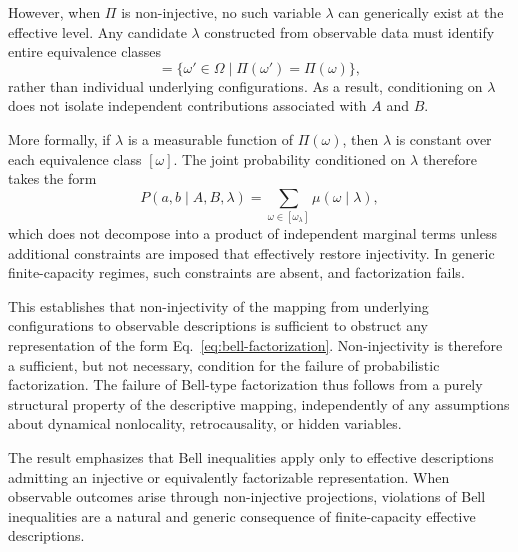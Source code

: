   However, when $\Pi$ is non-injective, no such variable $\lambda$ can generically
  exist at the effective level.
  Any candidate $\lambda$ constructed from observable data must identify entire
  equivalence classes
  \begin{equation}
    [\omega] = \{\omega' \in \Omega \mid \Pi(\omega')=\Pi(\omega)\},
  \end{equation}
  rather than individual underlying configurations.
  As a result, conditioning on $\lambda$ does not isolate independent contributions
  associated with $A$ and $B$.

  More formally, if $\lambda$ is a measurable function of $\Pi(\omega)$, then $\lambda$
  is constant over each equivalence class $[\omega]$.
  The joint probability conditioned on $\lambda$ therefore takes the form
  \begin{equation}
    P(a,b \mid A,B,\lambda)
    =
    \sum_{\omega \in [\omega_\lambda]} \mu(\omega \mid \lambda),
  \end{equation}
  which does not decompose into a product of independent marginal terms unless
  additional constraints are imposed that effectively restore injectivity.
  In generic finite-capacity regimes, such constraints are absent, and factorization fails.

  This establishes that non-injectivity of the mapping from underlying configurations
  to observable descriptions is sufficient to obstruct any representation of the form
  Eq.~\eqref{eq:bell-factorization}.
  Non-injectivity is therefore a sufficient, but not necessary, condition for the
  failure of probabilistic factorization.
  The failure of Bell-type factorization thus follows from a purely structural property
  of the descriptive mapping, independently of any assumptions about dynamical
  nonlocality, retrocausality, or hidden variables.

  The result emphasizes that Bell inequalities apply only to effective descriptions
  admitting an injective or equivalently factorizable representation.
  When observable outcomes arise through non-injective projections, violations of Bell
  inequalities are a natural and generic consequence of finite-capacity effective descriptions.
